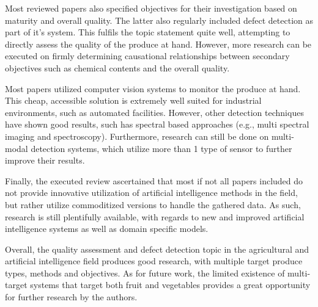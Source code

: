 \documentclass[conference]{IEEEtran}
\begin{document}
Most reviewed papers also specified objectives for their investigation based on maturity and overall quality. The latter also regularly included defect detection as part of it's system. This fulfils the topic statement quite well, attempting to directly assess the quality of the produce at hand. However, more research can be executed on firmly determining causational relationships between secondary objectives such as chemical contents and the overall quality.

Most papers utilized computer vision systems to monitor the produce at hand. This cheap, accessible solution is extremely well suited for industrial environments, such as automated facilities. However, other detection techniques have shown good results, such has spectral based approaches (e.g., multi spectral imaging and spectroscopy). Furthermore, research can still be done on multi-modal detection systems, which utilize more than 1 type of sensor to further improve their results.

Finally, the executed review ascertained that most if not all papers included do not provide innovative utilization of artificial intelligence methods in the field, but rather utilize commoditized versions to handle the gathered data. As such, research is still plentifully available, with regards to new and improved artificial intelligence systems as well as domain specific models.

Overall, the quality assessment and defect detection topic in the agricultural and artificial intelligence field produces good research, with multiple target produce types, methods and objectives. As for future work, the limited existence of multi-target systems that target both fruit and vegetables provides a great opportunity for further research by the authors.



\end{document}
